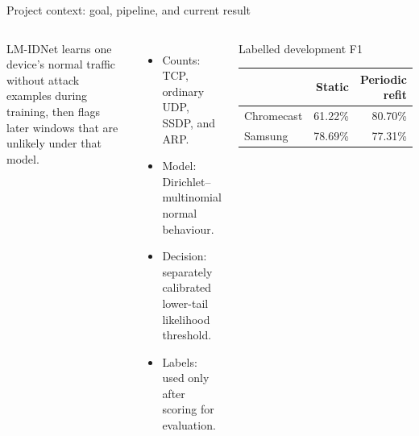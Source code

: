 \documentclass[aspectratio=169,10pt]{beamer}
\begin{document}
\begin{frame}{Project context: goal, pipeline, and current result}
\begin{columns}[T,onlytextwidth]
LM-IDNet learns one device's normal traffic without attack examples during
training, then flags later windows that are unlikely under that model.

\vspace{0.35cm}
\centering
{}

\vspace{0.45cm}
\begin{itemize}
  \item Counts: TCP, ordinary UDP, SSDP, and ARP.
  \item Model: Dirichlet--multinomial normal behaviour.
  \item Decision: separately calibrated lower-tail likelihood threshold.
  \item Labels: used only after scoring for evaluation.
\end{itemize}

\begin{block}{Labelled development F1}
\centering
\small
\begin{tabular}{@{}lrr@{}}
\toprule
& Static & Periodic refit \\
\midrule
Chromecast & 61.22\% & 80.70\% \\
Samsung & 78.69\% & 77.31\% \\
\bottomrule
\end{tabular}
\end{block}

\end{columns}
\end{frame}
\end{document}
